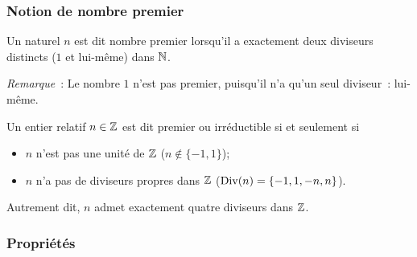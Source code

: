 \subsubsection{Notion de nombre premier}

\begin{defdef}
  Un naturel \(n\) est dit nombre premier lorsqu'il a exactement deux diviseurs
  distincts (\(1\) et lui-même) dans \(\mathbb{N}\).
\end{defdef}

\emph{Remarque}~: Le nombre \(1\) n'est pas premier, puisqu'il n'a qu'un seul
diviseur~: lui-même.

\begin{defdef}
  Un entier relatif \(n \in \mathbb{Z}\) est dit premier ou irréductible si et seulement
  si
  \begin{itemize}
    \item \(n\) n'est pas une unité de \(\mathbb{Z}\) (\(n \notin \{-1,1\}\));
    \item \(n\) n'a pas de diviseurs propres dans \(\mathbb{Z}\) (\(\operatorname{Div}(n) = \{-1, 1,
      -n, n\}\)).
  \end{itemize}
  Autrement dit, \(n\) admet exactement quatre diviseurs dans \(\mathbb{Z}\).
\end{defdef}

\subsubsection{Propriétés}


